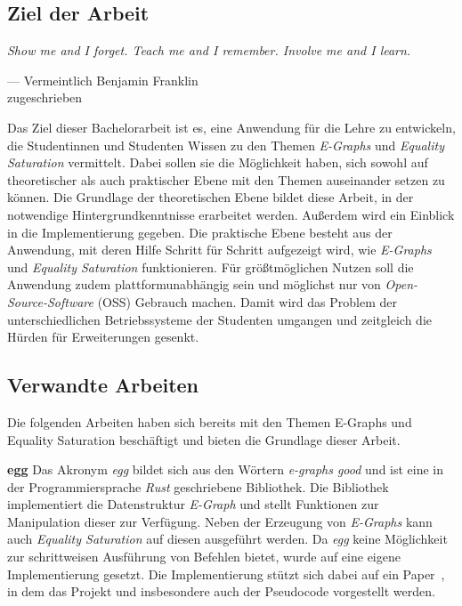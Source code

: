 \subsection{Ziel der Arbeit}

\vspace{5mm}
\begin{center}
    {\itshape
    \rmfamily
    \glqq Show me and I forget.
    Teach me and I remember. 
    Involve me and I learn.\grqq}
    \vspace{-3mm}
    \begin{flushright}
        \footnotesize
        --- Vermeintlich 
        Benjamin Franklin \\
        zugeschrieben
    \end{flushright}
\end{center}\vspace{3mm}

Das Ziel dieser Bachelorarbeit ist es, eine Anwendung für die Lehre zu entwickeln, die Studentinnen und Studenten Wissen zu den Themen \textit{E-Graphs} und \textit{Equality Saturation}
vermittelt. Dabei sollen sie die Möglichkeit haben, sich sowohl auf theoretischer als auch praktischer Ebene mit den Themen auseinander setzen zu können.
Die Grundlage der theoretischen Ebene bildet diese Arbeit, in der notwendige Hintergrundkenntnisse erarbeitet werden. Außerdem wird ein Einblick in die Implementierung gegeben. 
Die praktische Ebene besteht aus der Anwendung, mit deren Hilfe Schritt für Schritt aufgezeigt wird, wie \textit{E-Graphs} und \textit{Equality Saturation} funktionieren.
Für grö{\ss}tmöglichen Nutzen soll die Anwendung zudem plattformunabhängig sein und möglichst nur von \textit{Open-Source-Software} (OSS) Gebrauch machen.
Damit wird das Problem der unterschiedlichen Betriebssysteme der Studenten umgangen und zeitgleich die Hürden für Erweiterungen gesenkt.

\subsection{Verwandte Arbeiten}\label{sub:verwandtearbeiten}

Die folgenden Arbeiten haben sich bereits mit den Themen E-Graphs und Equality Saturation beschäftigt und bieten die Grundlage dieser Arbeit.

\noindent\textbf{egg} Das Akronym \textit{egg} bildet sich aus den Wörtern \textit{e-graphs good} und ist eine in der Programmiersprache \textit{Rust} geschriebene Bibliothek.
Die Bibliothek implementiert die Datenstruktur \textit{E-Graph} und stellt Funktionen zur Manipulation dieser zur Verfügung.
Neben der Erzeugung von \textit{E-Graphs} kann auch \textit{Equality Saturation} auf diesen ausgeführt werden.
Da \textit{egg} keine Möglichkeit zur schrittweisen Ausführung von Befehlen bietet, wurde auf eine eigene Implementierung gesetzt. Die Implementierung stützt sich dabei auf ein Paper~\cite{2021-egg}, in dem 
das Projekt und insbesondere auch der Pseudocode vorgestellt werden.

